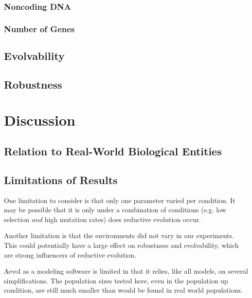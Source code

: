 \subsubsection{Noncoding DNA}

\subsubsection{Number of Genes}

\subsection{Evolvability}

\subsection{Robustness}


\section{Discussion}\label{discussion}

\subsection{Relation to Real-World Biological Entities}

\subsection{Limitations of Results}\label{limitations}
One limitation to consider is that only one parameter varied per condition. It may be possible that it is only under a combination of conditions (e.g. low selection \textit{and} high mutation rates) does reductive evolution occur. 

Another limitation is that the environments did not vary in our experiments. This could potentially have a large effect on robustness and evolvability, which are strong influencers of reductive evolution. 

Aevol as a modeling software is limited in that it relies, like all models, on several simplifications. The population sizes tested here, even in the population up condition, are still much smaller than would be found in real world populations. 